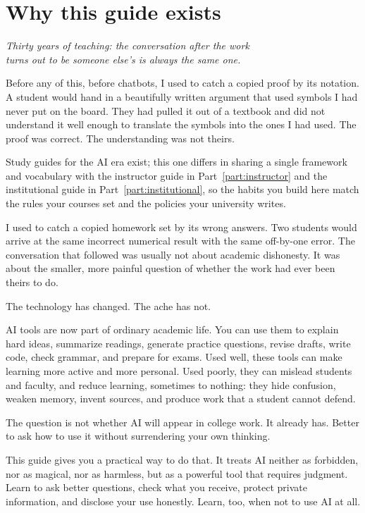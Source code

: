\documentclass{SIAMbook2023}
\newcommand{\bookepigraph}[1]{%
  \begin{center}%
    \begin{minipage}{0.78\textwidth}%
      \centering\itshape #1%
    \end{minipage}%
  \end{center}%
  \vspace{0.6em}%
}
\begin{document}
\section{Why this guide exists}
\label{sec:purpose}

\bookepigraph{Thirty years of teaching: the conversation after the work\\turns out to be someone else's is always the same one.}

Before any of this, before chatbots, I used to catch a copied proof by its notation. A student would hand in a beautifully written argument that used symbols I had never put on the board. They had pulled it out of a textbook and did not understand it well enough to translate the symbols into the ones I had used. The proof was correct. The understanding was not theirs.

Study guides for the AI era exist; this one differs in sharing a single framework and vocabulary with the instructor guide in Part~\ref{part:instructor} and the institutional guide in Part~\ref{part:institutional}, so the habits you build here match the rules your courses set and the policies your university writes.

I used to catch a copied homework set by its wrong answers. Two students would arrive at the same incorrect numerical result with the same off-by-one error. The conversation that followed was usually not about academic dishonesty. It was about the smaller, more painful question of whether the work had ever been theirs to do.

The technology has changed. The ache has not.

AI tools are now part of ordinary academic life. You can use them to explain hard ideas, summarize readings, generate practice questions, revise drafts, write code, check grammar, and prepare for exams. Used well, these tools can make learning more active and more personal. Used poorly, they can mislead students and faculty, and reduce learning, sometimes to nothing: they hide confusion, weaken memory, invent sources, and produce work that a student cannot defend.

The question is not whether AI will appear in college work. It already has. Better to ask how to use it without surrendering your own thinking.

This guide gives you a practical way to do that. It treats AI neither as forbidden, nor as magical, nor as harmless, but as a powerful tool that requires judgment. Learn to ask better questions, check what you receive, protect private information, and disclose your use honestly. Learn, too, when not to use AI at all.
\end{document}
